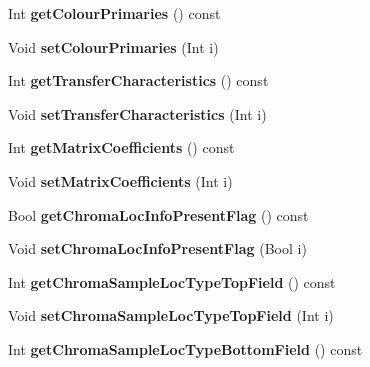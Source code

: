 \begin{DoxyCompactItemize}
\item 
\mbox{\label{class_t_com_v_u_i_ab0a11cf43085233e006d70c60d0f3ab4}} 
Int {\bfseries get\+Colour\+Primaries} () const
\item 
\mbox{\label{class_t_com_v_u_i_ac610b960b68a1231853703d9c48a1a97}} 
Void {\bfseries set\+Colour\+Primaries} (Int i)
\item 
\mbox{\label{class_t_com_v_u_i_a662fae725d7cf76835c7c6d01258795d}} 
Int {\bfseries get\+Transfer\+Characteristics} () const
\item 
\mbox{\label{class_t_com_v_u_i_a97f6ffda212b360089c75f48234b094d}} 
Void {\bfseries set\+Transfer\+Characteristics} (Int i)
\item 
\mbox{\label{class_t_com_v_u_i_a6235210fc4664fbb11bd2985d30c89ad}} 
Int {\bfseries get\+Matrix\+Coefficients} () const
\item 
\mbox{\label{class_t_com_v_u_i_a6b211609bfb07d10fefaf611add1d6d6}} 
Void {\bfseries set\+Matrix\+Coefficients} (Int i)
\item 
\mbox{\label{class_t_com_v_u_i_a5fbaed5d7a723e0d4ca36c36e22a59d3}} 
Bool {\bfseries get\+Chroma\+Loc\+Info\+Present\+Flag} () const
\item 
\mbox{\label{class_t_com_v_u_i_a792cc12c638ac10b8f06927001dfb84b}} 
Void {\bfseries set\+Chroma\+Loc\+Info\+Present\+Flag} (Bool i)
\item 
\mbox{\label{class_t_com_v_u_i_a0583d60fd266de8c3da20589bc54e11e}} 
Int {\bfseries get\+Chroma\+Sample\+Loc\+Type\+Top\+Field} () const
\item 
\mbox{\label{class_t_com_v_u_i_a3fd9d10edeb3f0ccf0ff9133a0bc388d}} 
Void {\bfseries set\+Chroma\+Sample\+Loc\+Type\+Top\+Field} (Int i)
\item 
\mbox{\label{class_t_com_v_u_i_aea4d8d9ec4f4fff6649b6956e78d9b6c}} 
Int {\bfseries get\+Chroma\+Sample\+Loc\+Type\+Bottom\+Field} () const

\end{DoxyCompactItemize}

